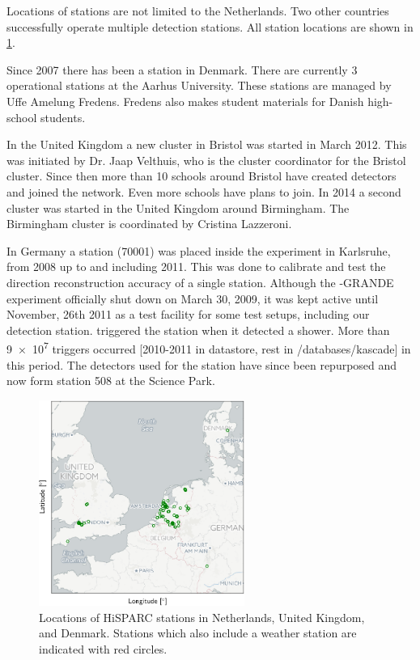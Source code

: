 Locations of \hisparc stations are not limited to the Netherlands. Two other countries successfully operate multiple detection stations. All station locations are shown in \cref{fig:network}.

Since 2007 there has been a \hisparc station in Denmark. There are currently 3 operational stations at the Aarhus University. These stations are managed by Uffe Amelung Fredens. Fredens also makes student materials for Danish high-school students.

In the United Kingdom a new cluster in Bristol was started in March 2012. This was initiated by Dr. Jaap Velthuis, who is the cluster coordinator for the Bristol cluster. Since then more than 10 schools around Bristol have created detectors and joined the network. Even more schools have plans to join. In 2014 a second cluster was started in the United Kingdom around Birmingham. The Birmingham cluster is coordinated by Cristina Lazzeroni.

In Germany a station (70001) was placed inside the \kascade experiment in Karlsruhe, from 2008 up to and including 2011. This was done to calibrate and test the direction reconstruction accuracy of a single \hisparc station. Although the \kascade-GRANDE experiment officially shut down on March 30, 2009, it was kept active until November, 26th 2011 as a test facility for some test setups, including our detection station. \kascade triggered the \hisparc station when it detected a shower. More than \num{9e7} triggers occurred [2010-2011 in datastore, rest in /databases/kascade] in this period. The detectors used for the \kascade station have since been repurposed and now form station 508 at the Science Park.

\begin{figure}
    \centering
    \includegraphics[width=0.6\textwidth]
                    {plots/experiment/network}
    \caption{Locations of HiSPARC stations in Netherlands, United Kingdom, and Denmark. Stations which also include a weather station are indicated with red circles.}
    \label{fig:network}
\end{figure}

